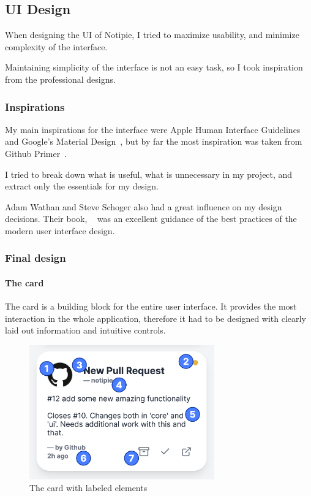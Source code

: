 \subsection{UI Design}\label{sec:ui-design}

When designing the UI of Notipie,
I tried to maximize usability,
and minimize complexity of the interface.

Maintaining simplicity of the interface is not an easy task,
so I took inspiration from the professional designs.

\subsubsection{Inspirations}\label{sec:inspirations}

My main inspirations for the interface were
Apple Human Interface Guidelines~\cite{apple_inc_human_2022}
and Google's Material Design~\cite{google_llc_material_2022},
but by far the most inspiration was taken from
Github Primer~\cite{github_inc_primer_2022}.

I tried to break down what is useful,
what is unnecessary in my project,
and extract only the essentials for my design.

Adam Wathan and Steve Schoger
also had a great influence
on my design decisions.
Their book,
~\cite{wathan_refactoring_2018}
was an excellent guidance of the best practices
of the modern user interface design.

\subsubsection{Final design}\label{sec:final-design}

\paragraph*{The card}\label{par:the-card}

The card is a building block for the entire user interface.
It provides the most interaction in the whole application,
therefore it had to be designed with clearly laid out information
and intuitive controls.

\begin{figure}[h]
      \centering
      \includegraphics[width=8cm,keepaspectratio]{img/card_labeled.png}
      \caption{The card with labeled elements}
      \label{fig:card-with-labeled-elements}
\end{figure}

